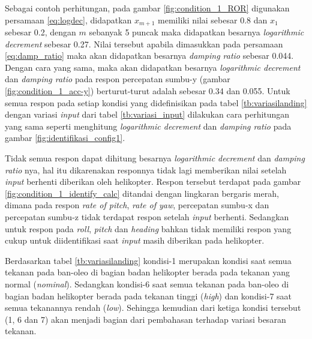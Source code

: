 Sebagai contoh perhitungan, pada gambar \ref{fig:condition_1_ROR} digunakan persamaan \ref{eq:logdec}, didapatkan $x_{m+1}$ memiliki nilai sebesar 0.8 dan $x_1$ sebesar 0.2, dengan $m$ sebanyak 5 puncak maka didapatkan besarnya \textit{logarithmic decrement} sebesar 0.27. Nilai tersebut apabila dimasukkan pada persamaan \ref{eq:damp_ratio} maka akan didapatkan besarnya \textit{damping ratio} sebesar 0.044. Dengan cara yang sama, maka akan didapatkan besarnya \textit{logarithmic decrement} dan \textit{damping ratio} pada respon percepatan sumbu-y (gambar \ref{fig:condition_1_acc-y}) berturut-turut adalah sebesar 0.34 dan 0.055. Untuk semua respon pada setiap kondisi yang didefinisikan pada tabel \ref{tb:variasilanding} dengan variasi \textit{input} dari tabel \ref{tb:variasi_input} dilakukan cara perhitungan yang sama seperti menghitung \textit{logarithmic decrement} dan \textit{damping ratio} pada gambar \ref{fig:identifikasi_config1}.

Tidak semua respon dapat dihitung besarnya \textit{logarithmic decrement} dan \textit{damping ratio} nya, hal itu dikarenakan responnya tidak lagi memberikan nilai setelah \textit{input} berhenti diberikan oleh helikopter. Respon tersebut terdapat pada gambar \ref{fig:condition_1_identify_calc} ditandai dengan lingkaran bergaris merah, dimana pada respon \textit{rate of pitch}, \textit{rate of yaw}, percepatan sumbu-x dan percepatan sumbu-z tidak terdapat respon setelah \textit{input} berhenti. Sedangkan untuk respon pada \textit{roll}, \textit{pitch} dan \textit{heading} bahkan tidak memiliki respon yang cukup untuk diidentifikasi saat \textit{input} masih diberikan pada helikopter.

Berdasarkan tabel \ref{tb:variasilanding} kondisi-1 merupakan kondisi saat semua tekanan pada ban-oleo di bagian badan helikopter berada pada tekanan yang normal (\textit{nominal}). Sedangkan kondisi-6 saat semua tekanan pada ban-oleo di bagian badan helikopter berada pada tekanan tinggi (\textit{high}) dan kondisi-7 saat semua tekanannya rendah (\textit{low}). Sehingga kemudian dari ketiga kondisi tersebut (1, 6 dan 7) akan menjadi bagian dari pembahasan terhadap variasi besaran tekanan.


